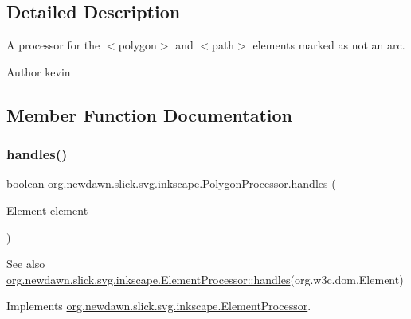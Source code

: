 \subsection{Detailed Description}
A processor for the $<$polygon$>$ and $<$path$>$ elements marked as not an arc.

\begin{DoxyAuthor}{Author}
kevin 
\end{DoxyAuthor}


\subsection{Member Function Documentation}
\mbox{\label{classorg_1_1newdawn_1_1slick_1_1svg_1_1inkscape_1_1_polygon_processor_ae16fc3ea9284d46c0db316bfeeca56f5}} 
\subsubsection{\texorpdfstring{handles()}{handles()}}
{\footnotesize\ttfamily boolean org.\+newdawn.\+slick.\+svg.\+inkscape.\+Polygon\+Processor.\+handles (\begin{DoxyParamCaption}\item[{Element}]{element }\end{DoxyParamCaption})\hspace{0.3cm}{\ttfamily [inline]}}

\begin{DoxySeeAlso}{See also}
\mbox{\hyperlink{interfaceorg_1_1newdawn_1_1slick_1_1svg_1_1inkscape_1_1_element_processor_ae95bbf21a67c52aff02cf09259c554a3}{org.\+newdawn.\+slick.\+svg.\+inkscape.\+Element\+Processor\+::handles}}(org.\+w3c.\+dom.\+Element) 
\end{DoxySeeAlso}


Implements \mbox{\hyperlink{interfaceorg_1_1newdawn_1_1slick_1_1svg_1_1inkscape_1_1_element_processor_ae95bbf21a67c52aff02cf09259c554a3}{org.\+newdawn.\+slick.\+svg.\+inkscape.\+Element\+Processor}}.


